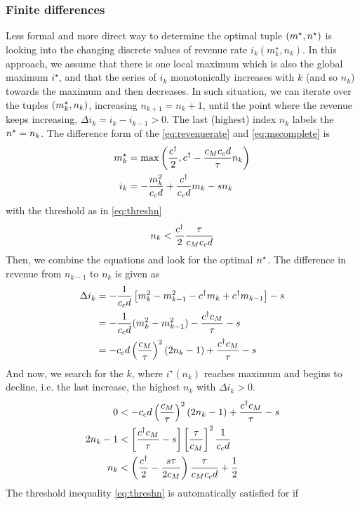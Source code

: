 \documentclass[a4paper]{report}
\begin{document}
\subsubsection{Finite differences}
Less formal and more direct way to determine the optimal tuple $(m^{\star},n^\star)$ is looking into the changing discrete values of revenue rate $i_k(m^\star_k,n_k)$. In this approach, we assume that there is one local maximum which is also the global maximum $i^\star$, and that the series of $i_k$ monotonically increases with $k$ (and so $n_k$) towards the maximum and then decreases. In such situation, we can iterate over the tuples $(m^{\star}_k,n_k)$, increasing $n_{k+1}=n_k+1$, until the point where the revenue keeps increasing, $\Delta i_k=i_k-i_{k-1}>0$. The last (highest) index $n_k$ labels the $n^\star=n_k$. The difference form of the \autoref{eq:revenuerate} and \autoref{eq:mscomplete} is
\begin{align}
	m^{\star}_k&=\max\left(\frac{c^{\dagger}}{2},c^{\dagger} - \frac{c_Mc_cd}{\tau} n_k\right) \label{eq:diffmnrel}\\
	i_k&=-\frac{m_k^2}{c_cd}+\frac{c^{\dagger}}{c_cd}m_k-sn_k \label{eq:diffincome}
\end{align}
with the threshold as in \autoref{eq:threshn}
\begin{equation*}
	n_k < \frac{c^{\dagger}}{2} \frac{\tau}{c_Mc_cd}
\end{equation*}
Then, we combine the equations and look for the optimal $n^\star$. The difference in revenue from $n_{k-1}$ to $n_k$ is given as
\begin{align*}
	\Delta i_k	&=-\frac{1}{c_cd}\left[m_k^2-m_{k-1}^2 -c^{\dagger} m_k +c^{\dagger} m_{k-1}\right] - s\\
			&=-\frac{1}{c_cd}(m_k^2-m_{k-1}^2)-\frac{c^{\dagger} c_M}{\tau}-s\\
			&=-c_cd\left(\frac{c_M}{\tau}\right)^2(2n_k-1)+\frac{c^{\dagger} c_M}{\tau}-s
\end{align*}
And now, we search for the $k$, where $i^\star(n_k)$ reaches maximum and begins to decline, i.e. the last increase, the highest $n_k$ with $\Delta i_k>0$.
\begin{align}
	0&<-c_cd\left(\frac{c_M}{\tau}\right)^2(2n_k-1)+\frac{c^{\dagger} c_M}{\tau}-s \nonumber\\
	2n_k-1&<\left[\frac{c^{\dagger} c_M}{\tau}-s\right]\left[\frac{\tau}{c_M}\right]^2\frac{1}{c_cd} \nonumber\\
	n_k&<\left(\frac{c^{\dagger}}{2}-\frac{s\tau}{2c_M}\right)\frac{\tau}{c_Mc_c d}+\frac{1}{2} \label{eq:maxnk}
\end{align}
The threshold inequality \autoref{eq:threshn} is automatically satisfied for \label{eq:maxnk} if
\end{document}

